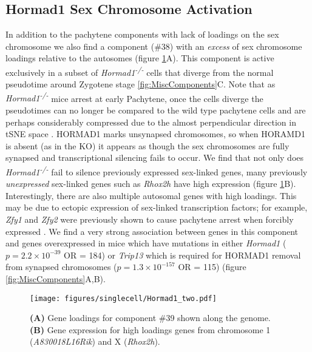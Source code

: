 \subsection{Hormad1 Sex Chromosome Activation}
In addition to the pachytene components with lack of loadings on the sex chromosome we also find a component (\#38) with an \textit{excess} of sex chromosome loadings relative to the autosomes (figure \ref{fig:Hormad1}A). This component is active exclusively in a subset of \textit{Hormad1\textsuperscript{-/-}} cells that diverge from the normal pseudotime around Zygotene stage \ref{fig:MiscComponents}C. Note that as \textit{Hormad1\textsuperscript{-/-}} mice arrest at early Pachytene, once the cells diverge the pseudotimes can no longer be compared to the wild type pachytene cells and are perhaps considerably compressed due to the almost perpendicular direction in tSNE space \parencite{Shin2010Hormad1}. HORMAD1 marks unsynapsed chromosomes, so when HORAMD1 is absent (as in the KO) it appears as though the sex chromosomes are fully synapsed and transcriptional silencing fails to occur. We find that not only does \textit{Hormad1\textsuperscript{-/-}} fail to silence previously expressed sex-linked genes, many previously \textit{unexpressed} sex-linked genes such as \textit{Rhox2h} have high expression (figure \ref{fig:Hormad1}B). Interestingly, there are also multiple autosomal genes with high loadings. This may be due to ectopic expression of sex-linked transcription factors; for example, \textit{Zfy1} and \textit{Zfy2} were previously shown to cause pachytene arrest when forcibly expressed \parencite{Royo2010Evidence}. We find a very strong association between genes in this component and genes overexpressed in mice which have mutations in either \textit{Hormad1} ($p = 2.2\times10^{-39}$ OR = 184) or \textit{Trip13} which is required for HORMAD1 removal from synapsed chromosomes ($p = 1.3\times10^{-157}$ OR = 115) \parencite{Ortega2016Surveillance, Wojtasz2009Mouse} (figure \ref{fig:MiscComponents}A,B).

\begin{figure}[H]
	\centering
	\texttt{[image: figures/singlecell/Hormad1\_two.pdf]}
	\caption[Hormad1 KO Component]{
		\textbf{(A)} Gene loadings for component \#39 shown along the genome.
		\textbf{(B)} Gene expression for high loadings genes from chromosome 1 (\textit{A830018L16Rik}) and X (\textit{Rhox2h}).
	}
	\label{fig:Hormad1}
\end{figure}



